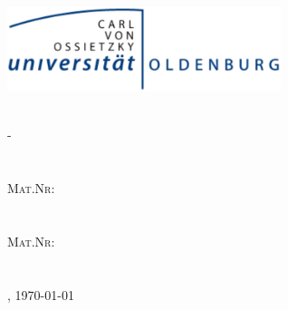 \begin{titlepage}
\thispagestyle{empty}

\begin{minipage}[t]{1\textwidth}
		\vspace{-2cm}
		\hspace{-1cm}
	\includegraphics[width=0.6\textwidth]{Pics/UniLogoBasis_Trans.pdf}
\end{minipage}

\begin{center}
\huge
\vspace{2cm}
\textsc{ \\-\\ }\\
\Large
\vspace{3cm}
\textsc{ \\ Mat.\-Nr:  \\
	~\\ 
	 \\ Mat.\-Nr:  }\\
\vspace{1.6cm}
\textsc{ \\ }\\
\vfill
\large
\textsc{, \today}
\end{center}


\end{titlepage}
